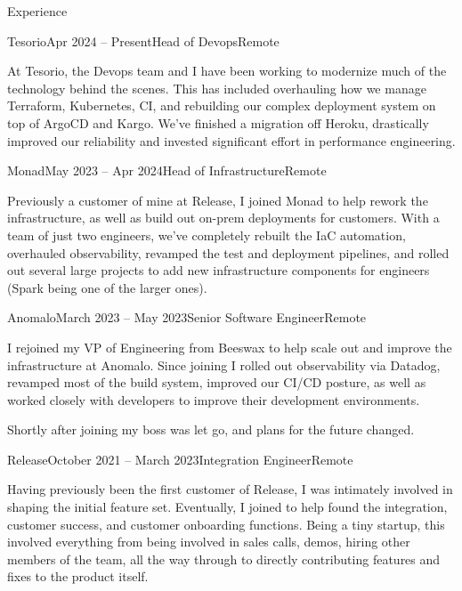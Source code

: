 \documentclass{resume} %
\begin{document}

\begin{rSection}{Experience}

\begin{rSubsection}{Tesorio}{Apr 2024 -- Present}{Head of Devops}{Remote}
\item[] At Tesorio, the Devops team and I have been working to modernize much of the technology behind the scenes. This has included overhauling how we manage Terraform, Kubernetes, CI, and rebuilding our complex deployment system on top of ArgoCD and Kargo.  We've finished a migration off Heroku, drastically improved our reliability and invested significant effort in performance engineering.

\end{rSubsection}

\begin{rSubsection}{Monad}{May 2023 -- Apr 2024}{Head of Infrastructure}{Remote}
\item[] Previously a customer of mine at Release, I joined Monad to help rework the infrastructure, as well as build out on-prem deployments for customers.  With a team of just two engineers, we've completely rebuilt the IaC automation, overhauled observability, revamped the test and deployment pipelines, and rolled out several large projects to add new infrastructure components for engineers (Spark being one of the larger ones).
\end{rSubsection}

\begin{rSubsection}{Anomalo}{March 2023 -- May 2023}{Senior Software Engineer}{Remote}
\item[] I rejoined my VP of Engineering from Beeswax to help scale out and improve the infrastructure at Anomalo.  Since joining I rolled out observability via Datadog, revamped most of the build system, improved our CI/CD posture, as well as worked closely with developers to improve their development environments.

Shortly after joining my boss was let go, and plans for the future changed.
\end{rSubsection}

\begin{rSubsection}{Release}{October 2021 -- March 2023}{Integration Engineer}{Remote}
\item[]Having previously been the first customer of Release, I was intimately involved in shaping the initial feature set.  Eventually, I joined to help found the integration, customer success, and customer onboarding functions.  Being a tiny startup, this involved everything from being involved in sales calls, demos, hiring other members of the team, all the way through to directly contributing features and fixes to the product itself.


\end{rSubsection}
\end{rSection}
\end{document}
